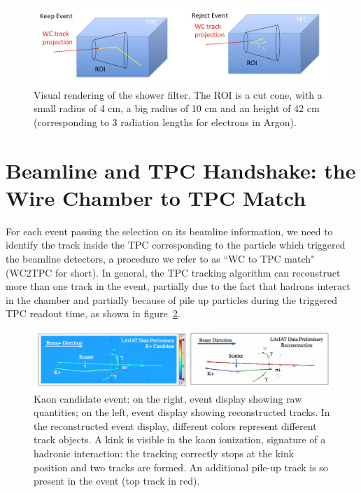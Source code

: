 \begin{figure}
  \centering  
\includegraphics[width=\textwidth]{Chapter-4/Images/Shower.png}
\caption{Visual rendering of the shower filter. The ROI is a cut cone, with a small radius of 4 cm, a big radius of 10 cm and an height of 42 cm (corresponding to 3 radiation lengths for electrons in Argon).}
\label{fig:showerFilt}
\end{figure}



\section{Beamline and TPC Handshake: the Wire Chamber to TPC Match}\label{ch:WC2TPCMatchMethod}
For each event passing the selection on its beamline information, we need to identify the track inside the TPC corresponding to the particle which triggered the beamline detectors, a procedure we refer to as ``WC to TPC match" (WC2TPC for short). In general, the TPC tracking algorithm can reconstruct more than one track in the event, partially due to the fact that hadrons interact in the chamber and partially because of pile up particles during the triggered TPC readout time, as shown in figure~\ref{fig:kaonInteraction}. 


\begin{figure}
  \centering  
\includegraphics[width=\textwidth]{Chapter-4/Images/KaonExample.png}
\caption{Kaon candidate event: on the right, event display showing raw quantities; on the left, event display showing reconstructed tracks. In the reconstructed event display, different colors represent different track objects. A kink is visible in the kaon ionization, signature of a hadronic interaction: the tracking correctly stops at the kink position and two tracks are formed. An additional pile-up track is so present in the event (top track in red).}
\label{fig:kaonInteraction}
\end{figure}



